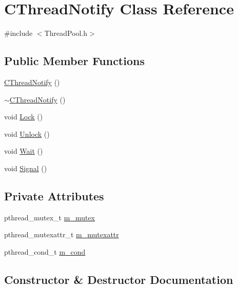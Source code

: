 \hypertarget{class_c_thread_notify}{}\section{C\+Thread\+Notify Class Reference}
\label{class_c_thread_notify}


{\ttfamily \#include $<$Thread\+Pool.\+h$>$}

\subsection*{Public Member Functions}
\begin{DoxyCompactItemize}
\item 
\hyperlink{class_c_thread_notify_a98f446f6ff57407294c05f60919f2953}{C\+Thread\+Notify} ()
\item 
\hyperlink{class_c_thread_notify_aa1a2ab61dacb63c5aef44ec5ef389bd2}{$\sim$\+C\+Thread\+Notify} ()
\item 
void \hyperlink{class_c_thread_notify_af35b36f3e0e67a9501c0b98a54f55d96}{Lock} ()
\item 
void \hyperlink{class_c_thread_notify_aa952fe44e9266f446ee83ad685589e7d}{Unlock} ()
\item 
void \hyperlink{class_c_thread_notify_a080c54c69615a202ffc99b1cc78adac1}{Wait} ()
\item 
void \hyperlink{class_c_thread_notify_ad636c603d4b16548ca0f3119c44d60dd}{Signal} ()
\end{DoxyCompactItemize}
\subsection*{Private Attributes}
\begin{DoxyCompactItemize}
\item 
pthread\+\_\+mutex\+\_\+t \hyperlink{class_c_thread_notify_a94ca2037b602e13f098883a9ef0487f9}{m\+\_\+mutex}
\item 
pthread\+\_\+mutexattr\+\_\+t \hyperlink{class_c_thread_notify_a9a70b8192eac3bb5eb661fc28047dfd3}{m\+\_\+mutexattr}
\item 
pthread\+\_\+cond\+\_\+t \hyperlink{class_c_thread_notify_ab7b227c91b9b5ab2fbbd7576dd0dd4a3}{m\+\_\+cond}
\end{DoxyCompactItemize}


\subsection{Constructor \& Destructor Documentation}
\hypertarget{class_c_thread_notify_a98f446f6ff57407294c05f60919f2953}{}
